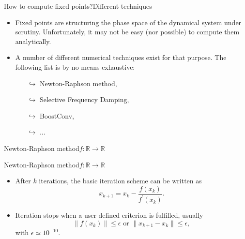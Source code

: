 \documentclass[usenames,dvipsnames,svgnames,10pt,aspectratio=169]{beamer}
\begin{document}
\begin{frame}[t, c]{How to compute fixed points?}{Different techniques}
	\begin{itemize}
		\item Fixed points are structuring the phase space of the dynamical system under scrutiny. Unfortunately, it may not be easy (nor possible) to compute them analytically.

		\bigskip

		\item A number of different numerical techniques exist for that purpose. The following list is by no means exhaustive:
		\begin{itemize}
			\item[$\hookrightarrow$] Newton-Raphson method,
			\item[$\hookrightarrow$] Selective Frequency Damping,
			\item[$\hookrightarrow$] BoostConv,
			\item[$\hookrightarrow$] ...
		\end{itemize}
	\end{itemize}

	\vspace{1cm}
\end{frame}

\begin{frame}[t, c]{Newton-Raphson method}{$f : \mathbb{R} \to \mathbb{R}$}

\end{frame}

\begin{frame}[t, c]{Newton-Raphson method}{$f : \mathbb{R} \to \mathbb{R}$}
	\begin{itemize}
		\item After $k$ iterations, the basic iteration scheme can be written as
		$$
		x_{k+1} = x_k - \displaystyle \frac{f(x_k)}{f^{\prime}(x_k)}.
		$$

		\bigskip

		\item Iteration stops when a user-defined criterion is fulfilled, usually
		$$
		\| f(x_k) \| \le \epsilon \text{ or } \| x_{k+1} - x_k \| \le \epsilon,
		$$
		with $\epsilon \simeq 10^{-10}$.
	\end{itemize}

	\vspace{1cm}
\end{frame}
\end{document}
